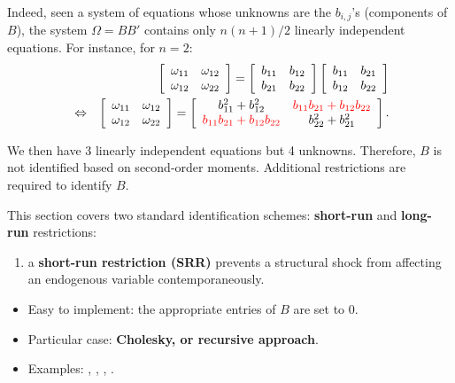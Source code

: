 \documentclass[
]{book}
\providecommand{\tightlist}{%
  \setlength{\itemsep}{0pt}\setlength{\parskip}{0pt}}
\theoremstyle{definition}
\theoremstyle{definition}
\theoremstyle{definition}
\theoremstyle{definition}
\theoremstyle{remark}
\begin{document}
Indeed, seen a system of equations whose unknowns are the \(b_{i,j}\)'s (components of \(B\)), the system \(\Omega = BB'\) contains only \(n(n+1)/2\) linearly independent equations. For instance, for \(n=2\):
\begin{eqnarray*}
&&\left[
\begin{array}{cc}
\omega_{11} & \omega_{12} \\
\omega_{12} & \omega_{22}
\end{array}
\right] = \left[
\begin{array}{cc}
b_{11} & b_{12} \\
b_{21} & b_{22}
\end{array}
\right]\left[
\begin{array}{cc}
b_{11} & b_{21} \\
b_{12} & b_{22}
\end{array}
\right]\\
&\Leftrightarrow&\left[
\begin{array}{cc}
\omega_{11} & \omega_{12} \\
\omega_{12} & \omega_{22}
\end{array}
\right] = \left[
\begin{array}{cc}
b_{11}^2+b_{12}^2 & \color{red}{b_{11}b_{21}+b_{12}b_{22}} \\
\color{red}{b_{11}b_{21}+b_{12}b_{22}} & b_{22}^2 + b_{21}^2
\end{array}
\right].
\end{eqnarray*}

We then have 3 linearly independent equations but 4 unknowns. Therefore, \(B\) is not identified based on second-order moments. Additional restrictions are required to identify \(B\).

This section covers two standard identification schemes: \textbf{short-run} and \textbf{long-run} restrictions:

\begin{enumerate}
\def\labelenumi{\arabic{enumi}.}
\tightlist
\item
  a \textbf{short-run restriction (SRR)} prevents a structural shock from affecting an endogenous variable contemporaneously.
\end{enumerate}

\begin{itemize}
\tightlist
\item
  Easy to implement: the appropriate entries of \(B\) are set to 0.
\item
  Particular case: \textbf{Cholesky, or recursive approach}.
\item
  Examples: \citet{BERNANKE198649}, \citet{Sims_1986}, \citet{Gali_1992}, \citet{RubioRamirez_et_al_2010}.
\end{itemize}
\end{document}
